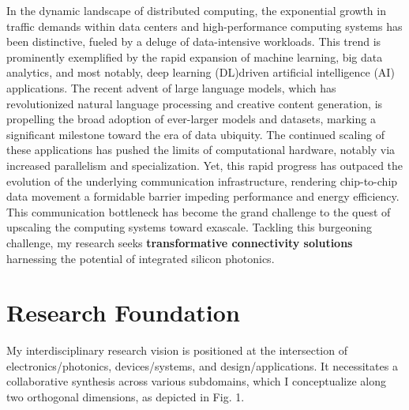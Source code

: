 In the dynamic landscape of distributed computing, the exponential growth in traffic demands within data centers and high-performance computing systems has been distinctive, fueled by a deluge of data-intensive workloads. This trend is prominently exemplified by the rapid expansion of machine learning, big data analytics, and most notably, deep learning (DL)\textendash driven artificial intelligence (AI) applications. The recent advent of large language models, which has revolutionized natural language processing and creative content generation, is propelling the broad adoption of ever-larger models and datasets, marking a significant milestone toward the era of data ubiquity. The continued scaling of these applications has pushed the limits of computational hardware, notably via increased parallelism and specialization. Yet, this rapid progress has outpaced the evolution of the underlying communication infrastructure, rendering chip-to-chip data movement a formidable barrier impeding performance and energy efficiency. This communication bottleneck has become the grand challenge to the quest of upscaling the computing systems toward exascale. Tackling this burgeoning challenge, my research seeks \textbf{transformative connectivity solutions} harnessing the potential of integrated silicon photonics.

\section{Research Foundation}

My interdisciplinary research vision is positioned at the intersection of electronics/photonics, devices/systems, and design/applications. It necessitates a collaborative synthesis across various subdomains, which I conceptualize along two orthogonal dimensions, as depicted in Fig. 1.